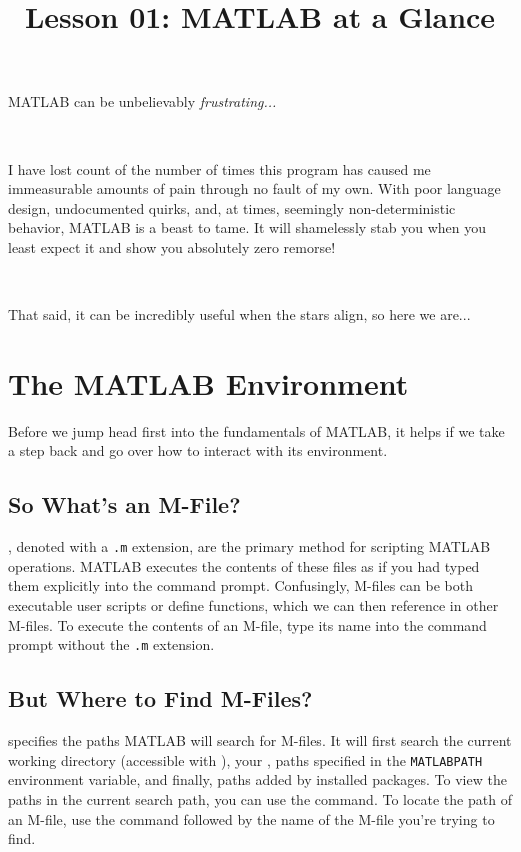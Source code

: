 \documentclass{article}
\title{Lesson 01: MATLAB at a Glance}
\begin{document}
\renderTitle

\noindent
MATLAB can be unbelievably \emph{frustrating...}

\

\noindent
I have lost count of the number of times this program has caused me
immeasurable amounts of pain through no fault of my own. With poor
language design, undocumented quirks, and, at times, seemingly
non-deterministic behavior, MATLAB is a beast to tame.  It will
shamelessly stab you when you least expect it and show you absolutely
zero remorse!

\

\noindent
That said, it can be incredibly useful when the stars align, so here we
are...

\section{The MATLAB Environment}

Before we jump head first into the fundamentals of MATLAB, it helps if
we take a step back and go over how to interact with its environment.

\subsection{So What’s an M-File?}

, denoted with a \texttt{.m} extension, are the primary
method for scripting MATLAB operations.  MATLAB executes the contents of
these files as if you had typed them explicitly into the command prompt.
Confusingly, M-files can be both executable user scripts or define
functions, which we can then reference in other M-files.  To execute the
contents of an M-file, type its name into the command prompt without the
\texttt{.m} extension.

\subsection{But Where to Find M-Files?}

 specifies the
paths MATLAB will search for M-files.  It will first search the current
working directory (accessible with ), your , paths specified in the
\texttt{MATLABPATH} environment variable, and finally, paths added by
installed packages.  To view the paths in the current search path, you
can use the  command.  To locate the path of an M-file, use the
command followed by the name of the M-file you're trying to find.
\end{document}
